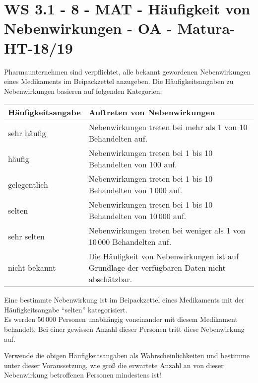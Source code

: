 \section{WS 3.1 - 8 - MAT - Häufigkeit von Nebenwirkungen - OA - Matura-HT-18/19}

\begin{beispiel}[WS 3.1]{1}
Pharmaunternehmen sind verpflichtet, alle bekannt gewordenen Nebenwirkungen eines Medikaments im Beipackzettel anzugeben. Die Häufigkeitsangaben zu Nebenwirkungen basieren auf
folgenden Kategorien:

\begin{center}
\begin{tabular}{|l|p{10cm}|} \hline

\rowcolor{lightgray} Häufigkeitsangabe & Auftreten von Nebenwirkungen \\ \hline

sehr häufig & Nebenwirkungen treten bei mehr als 1 von 10 Behandelten auf. \\ \hline

häufig & Nebenwirkungen treten bei 1 bis 10 Behandelten von 100 auf. \\ \hline

gelegentlich & Nebenwirkungen treten bei 1 bis 10 Behandelten von 1\,000 auf. \\ \hline

selten & Nebenwirkungen treten bei 1 bis 10 Behandelten von 10\,000 auf.\\ \hline
 
sehr selten & Nebenwirkungen treten bei weniger als 1 von 10\,000 Behandelten auf. \\ \hline
  
nicht bekannt   & Die Häufigkeit von Nebenwirkungen ist auf Grundlage der verfügbaren Daten nicht abschätzbar.\\ \hline

\end{tabular}
\end{center}

Eine bestimmte Nebenwirkung ist im Beipackzettel eines Medikaments mit der Häufigkeitsangabe
"`selten"' kategorisiert.\\
Es werden 50\,000 Personen unabhängig voneinander mit diesem Medikament behandelt. Bei einer gewissen Anzahl dieser Personen tritt diese Nebenwirkung auf.\leer

Verwende die obigen Häufigkeitsangaben als Wahrscheinlichkeiten und bestimme unter
dieser Voraussetzung, wie groß die erwartete Anzahl an von dieser Nebenwirkung betroffenen
Personen mindestens ist!

\end{beispiel}